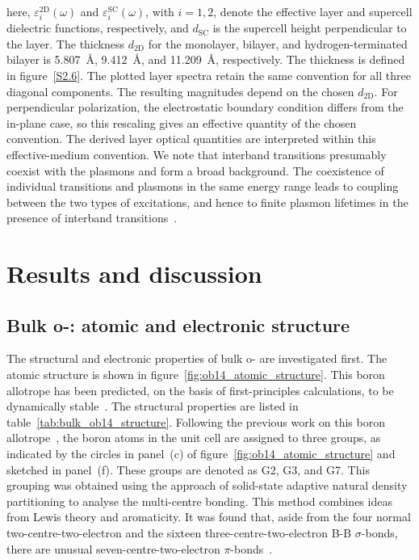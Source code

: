 here, $\varepsilon_{i}^{\mathrm{2D}}(\omega)$ and $\varepsilon_{i}^{\mathrm{SC}}(\omega)$,
with $i=1,2$, denote the effective layer and supercell dielectric functions,
respectively, and $d_{\mathrm{SC}}$ is the supercell height perpendicular to the layer.
The thickness $d_{\mathrm{2D}}$ for the monolayer, bilayer,
and hydrogen-terminated bilayer is \qty{5.807}{\angstrom},
\qty{9.412}{\angstrom}, and \qty{11.209}{\angstrom}, respectively.
The thickness is defined in figure~\ref{S2.6}.
The plotted layer spectra retain the same convention for all three diagonal components.
The resulting magnitudes depend on the chosen $d_{\mathrm{2D}}$.
For perpendicular polarization, the electrostatic boundary condition differs from the in-plane case,
so this rescaling gives an effective quantity of the chosen convention.
The derived layer optical quantities are interpreted within this effective-medium convention.
We note that interband transitions presumably coexist with the plasmons and form a broad background.
The coexistence of individual transitions and plasmons in the same energy range leads to coupling between the two types of excitations,
and hence to finite plasmon lifetimes in the presence of interband transitions~\cite{li2017first}.

\FloatBarrier
\section{Results and discussion}
\label{2_results}


\FloatBarrier
\subsection{\texorpdfstring{Bulk o-: atomic and electronic structure}{Bulk o-B14: atomic and electronic structure}}
\label{2_bulk_atomic_electronic_structure}

The structural and electronic properties of bulk o- are investigated first.
The atomic structure is shown in figure~\ref{fig:ob14_atomic_structure}.
This boron allotrope has been predicted, on the basis of first-principles calculations,
to be dynamically stable~\cite{han2023superconducting}.
The structural properties are listed in table~\ref{tab:bulk_ob14_structure}.
Following the previous work on this boron allotrope~\cite{han2023superconducting},
the boron atoms in the unit cell are assigned to three groups,
as indicated by the circles in panel~(c) of figure~\ref{fig:ob14_atomic_structure} and sketched in panel~(f).
These groups are denoted as G2, G3, and G7.
This grouping was obtained using the approach of solid-state adaptive natural density partitioning to analyse the multi-centre bonding.
This method combines ideas from Lewis theory and aromaticity.
It was found that, aside from the four normal two-centre-two-electron and the sixteen three-centre-two-electron B-B $\sigma$-bonds,
there are unusual seven-centre-two-electron $\pi$-bonds~\cite{han2023superconducting}.

